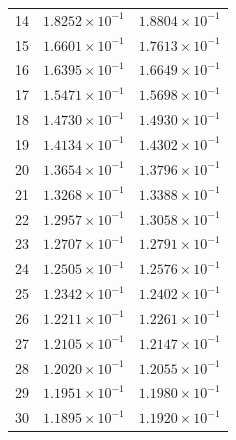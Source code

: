 \begin{table}[H]
\begin{tabular}{@{}rrr@{}}
14 & $1.8252\times10^{-1}$ & $1.8804\times10^{-1}$\\
15 & $1.6601\times10^{-1}$ & $1.7613\times10^{-1}$\\
16 & $1.6395\times10^{-1}$ & $1.6649\times10^{-1}$\\
17 & $1.5471\times10^{-1}$ & $1.5698\times10^{-1}$\\
18 & $1.4730\times10^{-1}$ & $1.4930\times10^{-1}$\\
19 & $1.4134\times10^{-1}$ & $1.4302\times10^{-1}$\\
20 & $1.3654\times10^{-1}$ & $1.3796\times10^{-1}$\\
21 & $1.3268\times10^{-1}$ & $1.3388\times10^{-1}$\\
22 & $1.2957\times10^{-1}$ & $1.3058\times10^{-1}$\\
23 & $1.2707\times10^{-1}$ & $1.2791\times10^{-1}$\\
24 & $1.2505\times10^{-1}$ & $1.2576\times10^{-1}$\\
25 & $1.2342\times10^{-1}$ & $1.2402\times10^{-1}$\\
26 & $1.2211\times10^{-1}$ & $1.2261\times10^{-1}$\\
27 & $1.2105\times10^{-1}$ & $1.2147\times10^{-1}$\\
28 & $1.2020\times10^{-1}$ & $1.2055\times10^{-1}$\\
29 & $1.1951\times10^{-1}$ & $1.1980\times10^{-1}$\\
30 & $1.1895\times10^{-1}$ & $1.1920\times10^{-1}$\\
\bottomrule
\end{tabular}
\end{table}

